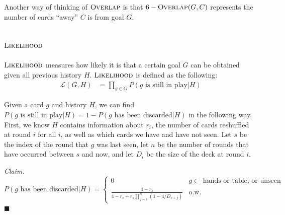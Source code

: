 \documentclass[11pt]{article}
\newcommand{\overlap}{\textsc{Overlap}}
\newcommand{\lkhd}{\textsc{Likelihood}}
\newenvironment{claim}[1]{\par\noindent\textit{Claim.}\space#1}{\hfill $\blacksquare$}
\begin{document}
Another way of thinking of $\overlap$ is that $6-\overlap(G,C)$ represents the number of cards ``away'' $C$ is from goal $G$.

\subsection{$\lkhd$}

$\lkhd$ measures how likely it is that a certain goal $G$ can be obtained given all previous history $H$. $\lkhd$ is defined as the following:
\begin{align}
  \mathcal{L}(G,H) &= \prod_{g \in G} P(g \text{ is still in play}|H)
\end{align}

Given a card $g$ and history $H$, we can find $P(g \text{ is still in play}|H) = 1 - P(g \text{ has been discarded}|H)$ in the following way. First, we know $H$ contains information about $r_i$, the number of cards reshuffled at round $i$ for all $i$, as well as which cards we have and have not seen. Let $s$ be the index of the round that $g$ was last seen, let $n$ be the number of rounds that have occurred between $s$ and now, and let $D_i$ be the size of the deck at round $i$.

\begin{claim}
\begin{equation}
P(g \text{ has been discarded}|H) = \begin{cases}
  0 & g \in \text{ hands or table, or unseen} \\
  \frac{4-r_s}{4-r_s+r_s\prod_{j=1}^n(1-4/{D_{s+j}})} & \text{o.w.}
\end{cases}
\label{eq:p-discarded} \end{equation}
\end{claim}
\end{document}

